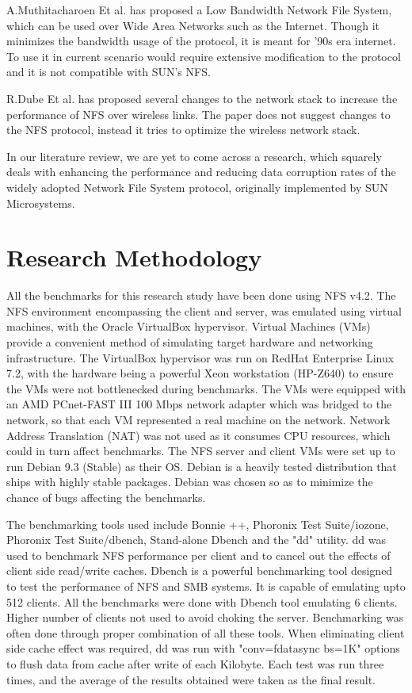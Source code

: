 \documentclass[conference]{IEEEtran}
\begin{document}
A.Muthitacharoen Et al. has proposed a Low Bandwidth Network File System,
which can be used over Wide Area Networks such as the Internet. Though it
minimizes the bandwidth usage of the protocol, it is meant for '90s
era internet. To use it in current scenario would require extensive 
modification to the protocol and it is not compatible with SUN's NFS.

R.Dube Et al. has proposed several changes to the network stack to increase
the performance of NFS over wireless links. The paper does not suggest
changes to the NFS protocol, instead it tries to optimize the wireless
network stack.

In our literature review, we are yet to come across a research, which
squarely deals with enhancing the performance and reducing data corruption
rates of the widely adopted Network File System protocol, originally
implemented by SUN Microsystems.

\section{Research Methodology}
All the benchmarks for this research study have been done using NFS v4.2.
The NFS environment encompassing the client and server, was emulated using
virtual machines, with the Oracle VirtualBox hypervisor. Virtual Machines 
(VMs) provide a convenient method of simulating target hardware and 
networking infrastructure. The VirtualBox hypervisor was run on RedHat 
Enterprise Linux 7.2, with the hardware being a powerful Xeon workstation
(HP-Z640) to ensure the VMs were not bottlenecked during benchmarks. The VMs
were equipped with an AMD PCnet-FAST III 100 Mbps network adapter which was
bridged to the network, so that each VM represented a real machine on the 
network. Network Address Translation (NAT) was not used as it consumes CPU
resources, which could in turn affect benchmarks. The NFS server and client
VMs were set up to run Debian 9.3 (Stable) as their OS. Debian is a heavily
tested distribution that ships with highly stable packages. Debian was 
chosen so as to minimize the chance of bugs affecting the benchmarks.

The benchmarking tools used include Bonnie ++, Phoronix Test Suite/iozone,
Phoronix Test Suite/dbench, Stand-alone Dbench and the "dd" utility. dd was
used to benchmark NFS performance per client and to cancel out the effects
of client side read/write caches. Dbench is a powerful benchmarking tool
designed to test the performance of NFS and SMB systems. It is capable of
emulating upto 512 clients. All the benchmarks were done with Dbench tool
emulating 6 clients. Higher number of clients not used to avoid choking the
server. Benchmarking was often done through proper combination of all these
tools. When eliminating client side cache effect was required, dd was run
with "conv=fdatasync bs=1K" options to flush data from cache after write of
each Kilobyte. Each test was run three times, and the average of the results
obtained were taken as the final result.
\end{document}
